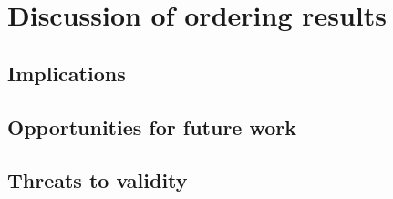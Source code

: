 \section{Discussion of ordering results}
\subsection{Implications}
\subsection{Opportunities for future work}
\subsection{Threats to validity}
